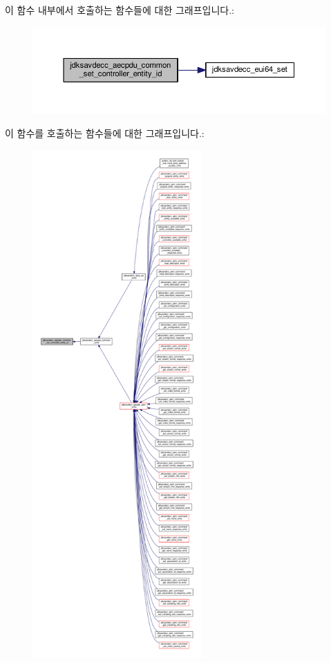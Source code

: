 이 함수 내부에서 호출하는 함수들에 대한 그래프입니다.\+:
\nopagebreak
\begin{figure}[H]
\begin{center}
\leavevmode
\includegraphics[width=350pt]{group__aecpdu__common_ga5eb29ca4c6d9dc424e108e99132d4ec7_cgraph}
\end{center}
\end{figure}




이 함수를 호출하는 함수들에 대한 그래프입니다.\+:
\nopagebreak
\begin{figure}[H]
\begin{center}
\leavevmode
\includegraphics[height=550pt]{group__aecpdu__common_ga5eb29ca4c6d9dc424e108e99132d4ec7_icgraph}
\end{center}
\end{figure}


